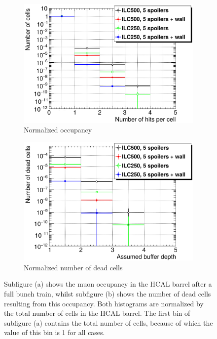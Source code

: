  \begin{figure}
 \centering
  \begin{subfigure}[b]{0.49\textwidth}
   \centering
    \includegraphics[width=\textwidth]{Figures/BDS_muons/Occupancy_Comparison_All_layers_wrt_cells_HcalBarrel.png}
   \caption{Normalized occupancy}
   \end{subfigure}
   \hfill
    \begin{subfigure}[b]{0.49\textwidth}
   \centering
    \includegraphics[width=\textwidth]{Figures/BDS_muons/Occupancy_Comparison_All_layers_deadcells_HcalBarrel.png}
   \caption{Normalized number of dead cells}
   \end{subfigure}
   \caption[\sid HCAL barrel occupancy from BDS muons]{Subfigure (a) shows the muon occupancy in the \sid HCAL barrel after a full bunch train, whilst subfigure (b) shows the number of dead cells resulting from this occupancy.
   Both histograms are normalized by the total number of cells in the HCAL barrel.
   The first bin of subfigure (a) contains the total number of cells, because of which the value of this bin is 1 for all cases.}
   \label{fig:BDS_Muons:HcalBarrel}
 \end{figure}
